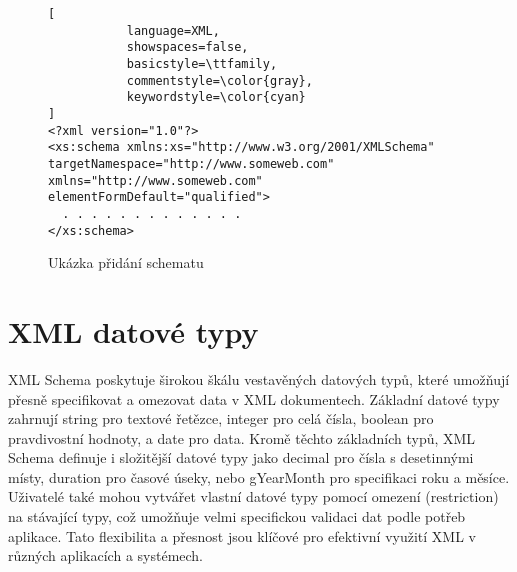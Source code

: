 \newpage
\begin{figure}[H]
\centering
\begin{lstlisting}[
           language=XML,
           showspaces=false,
           basicstyle=\ttfamily,
           commentstyle=\color{gray},
           keywordstyle=\color{cyan}
]
<?xml version="1.0"?>
<xs:schema xmlns:xs="http://www.w3.org/2001/XMLSchema"
targetNamespace="http://www.someweb.com"
xmlns="http://www.someweb.com"
elementFormDefault="qualified">
  . . . . . . . . . . . . .
</xs:schema>
\end{lstlisting}
\caption{Ukázka přidání schematu}
\label{fig:xml_schema}
\end{figure}


\section{XML datové typy}
\label{sec:xml_datatypes}
XML Schema poskytuje širokou škálu vestavěných datových typů, které umožňují přesně specifikovat a omezovat data v XML dokumentech. Základní datové typy zahrnují string pro textové řetězce, integer pro celá čísla, boolean pro pravdivostní hodnoty, a date pro data. Kromě těchto základních typů, XML Schema definuje i složitější datové typy jako decimal pro čísla s desetinnými místy, duration pro časové úseky, nebo gYearMonth pro specifikaci roku a měsíce. Uživatelé také mohou vytvářet vlastní datové typy pomocí omezení (restriction) na stávající typy, což umožňuje velmi specifickou validaci dat podle potřeb aplikace. Tato flexibilita a přesnost jsou klíčové pro efektivní využití XML v různých aplikacích a systémech.